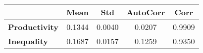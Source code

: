 \begin{tiny}\begin{tabular}{|l|c|c|c|c|}
\hline
&\textbf{Mean}&\textbf{Std}&\textbf{AutoCorr}&\textbf{Corr}\\\hline
\textbf{Productivity}&0.1344&0.0040&0.0207&0.9909\\\hline
\textbf{Inequality}&0.1687&0.0157&0.1259&0.9350\\\hline
\end{tabular}
\end{tiny}